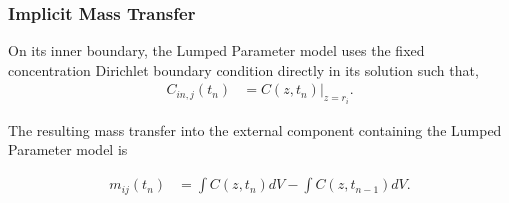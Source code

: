 \subsubsection{Implicit Mass Transfer}

On its inner boundary, the Lumped Parameter model uses the fixed concentration  
Dirichlet boundary condition directly in its solution such that, 
\begin{align}
C_{in,j}(t_n) &= C(z, t_n)|_{z=r_i}.
\end{align}

The resulting mass transfer into the external component containing the Lumped 
Parameter model is 

\begin{align}
m_{ij}(t_n) &=\int C(z,t_n)dV - \int C(z, t_{n-1})dV.
\end{align}
